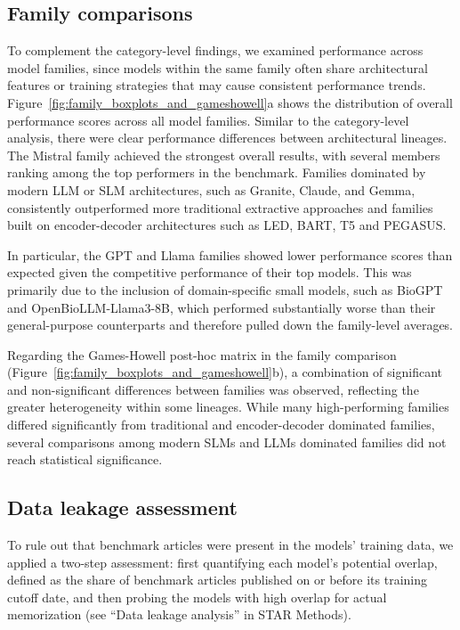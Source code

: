 \subsection{Family comparisons}

To complement the category-level findings, we examined performance across model families, since models within the same family often share architectural features or training strategies that may cause consistent performance trends. Figure~\ref{fig:family_boxplots_and_gameshowell}a shows the distribution of overall performance scores across all model families. Similar to the category-level analysis, there were clear performance differences between architectural lineages. The Mistral family achieved the strongest overall results, with several members ranking among the top performers in the benchmark. Families dominated by modern \ac{LLM} or \ac{SLM} architectures, such as Granite, Claude, and Gemma, consistently outperformed more traditional extractive approaches and families built on encoder-decoder architectures such as \ac{LED}, \ac{BART}, \ac{T5} and \ac{PEGASUS}.

In particular, the \ac{GPT} and \ac{Llama} families showed lower performance scores than expected given the competitive performance of their top models. This was primarily due to the inclusion of domain-specific small models, such as BioGPT and OpenBioLLM-Llama3-8B, which performed substantially worse than their general-purpose counterparts and therefore pulled down the family-level averages.

Regarding the Games-Howell post-hoc matrix in the family comparison (Figure~\ref{fig:family_boxplots_and_gameshowell}b), a combination of significant and non-significant differences between families was observed, reflecting the greater heterogeneity within some lineages. While many high-performing families differed significantly from traditional and encoder-decoder dominated families, several comparisons among modern \acp{SLM} and \acp{LLM} dominated families did not reach statistical significance.

\subsection{Data leakage assessment}

To rule out that benchmark articles were present in the models' training data, we applied a two-step assessment: first quantifying each model's potential overlap, defined as the share of benchmark articles published on or before its training cutoff date, and then probing the models with high overlap for actual memorization (see ``Data leakage analysis'' in STAR Methods).

